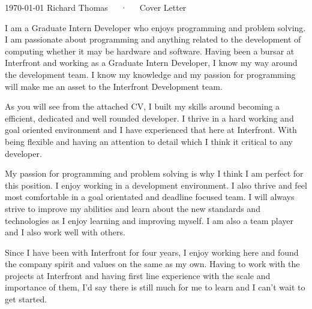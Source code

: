 \documentclass[11pt, a4paper]{awesome-cv}
\begin{document}
\makecvheader[R]

\makecvfooter
  {\today}
  {Richard Thomas~~~·~~~Cover Letter}
  {}

\makelettertitle

\begin{cvletter}


I am a Graduate Intern Developer who enjoys programming and problem solving. I am passionate about programming and anything related to the development of computing whether it may be hardware and software. Having been a bursar at Interfront and working as a Graduate Intern Developer, I know my way around the development team. I know my knowledge and my passion for programming will make me an asset to the Interfront Development team.   

As you will see from the attached CV, I built my skills around becoming a efficient, dedicated  and well rounded developer. I thrive in a hard working and goal oriented environment and I have experienced that here at Interfront. With being flexible and having an attention to detail which I think it critical to any developer. 

My passion for programming and problem solving is why I think I am perfect for this position. I enjoy working in a development environment. I also thrive and feel most comfortable in a goal orientated and deadline focused team. I will always strive to improve my abilities and learn about the new standards and technologies as I enjoy learning and improving myself. I am also a team player and I also work well with others. 

Since I have been with Interfront for four years, I enjoy working here and found the company spirit and values on the same as my own. Having to work with the projects at Interfront and having first line experience with the scale and importance of them, I'd say there is still much for me to learn and I can't wait to get started. 
\end{cvletter}


\makeletterclosing
\end{document}
